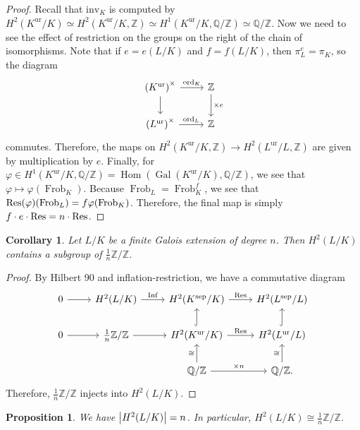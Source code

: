 \documentclass[leqno, openany]{memoir}
\newtheorem{cor}[thm]{Corollary}
\newtheorem{prop}[thm]{Proposition}
\theoremstyle{definition}
\theoremstyle{remark}
\theoremstyle{plain}
\theoremstyle{definition}
\theoremstyle{remark}
\newcommand{\Z}{\mathbb{Z}}
\newcommand{\Q}{\mathbb{Q}}
\newcommand{\mr}[1]{\mathrm{#1}}
\DeclareMathOperator{\Hom}{Hom}
\DeclareMathOperator{\Gal}{Gal}
\DeclareMathOperator{\Inf}{Inf}
\DeclareMathOperator{\Frob}{Frob}
\begin{document}
\begin{proof} Recall that $\mr{inv}_K$ is computed by $H^2(K^{\mr{ur}}/K)
    \simeq H^2(K^{\mr{ur}}/K, \Z) \simeq H^1(K^{\mr{ur}}/K, \Q/\Z) \simeq
    \Q/\Z$. Now we need to see the effect of restriction on the groups on the
    right of the chain of isomorphisms. Note that if $e = e(L/K)$ and $f =
    f(L/K)$, then $\pi_L^e = \pi_K$, so the diagram \begin{equation*}
        \begin{tikzcd} {(K^{\mr{ur}})}^{\times} \ar{d} \ar{r}{\mr{ord}_K} & \Z
        \ar{d}{\times e} \\ {(L^{\mr{ur}})}^{\times} \ar{r}{\mr{ord}_L} & \Z
    \end{tikzcd} \end{equation*} commutes. Therefore, the maps on
    $H^2(K^{\mr{ur}}/K, \Z) \to H^2(L^{\mr{ur}}/L, \Z)$ are given by
    multiplication by $e$. Finally, for $\varphi \in H^1(K^{\mr{ur}}/K, \Q/\Z)
    = \Hom(\Gal(K^{\mr{ur}}/K), \Q/\Z)$, we see that $\varphi \mapsto
    \varphi(\Frob_K)$. Because $\Frob_L = \Frob_K^f$, we see that
    $\Res(\varphi)(\Frob_L) = f \varphi(\Frob_K)$. Therefore, the final map is
    simply $f \cdot e \cdot \Res = n \cdot \Res$.  \end{proof}

\begin{cor} Let $L/K$ be a finite Galois extension of degree $n$. Then
$H^2(L/K)$ contains a subgroup of $\frac{1}{n} \Z/\Z$.  \end{cor}

\begin{proof} By Hilbert 90 and inflation-restriction, we have a commutative
    diagram \begin{equation*} \begin{tikzcd} 0 \ar{r} & H^2(L/K) \ar{r}{\Inf} &
        H^2(K^{\mr{sep}}/K) \ar{r}{\Res} & H^2(L^{\mr{sep}}/L) \\ 0 \ar{r} &
        \frac{1}{n}\Z/\Z \ar{r} & H^2(K^{\mr{ur}}/K) \ar{r}{\Res}
        \ar[hookrightarrow]{u} & H^2(L^{\mr{ur}}/L) \ar[hookrightarrow]{u} \\ &
                               & \Q/\Z \ar{r}{\times n} \ar{u}{\cong} & \Q/\Z
                           \ar{u}{\cong}.  \end{tikzcd} \end{equation*}
                       Therefore, $\frac{1}{n}\Z/\Z$ injects into $H^2(L/K)$.
    \end{proof}

\begin{prop} We have $\abs{H^2(L/K)} = n$. In particular, $H^2(L/K) \cong
\frac{1}{n} \Z/\Z$.  \end{prop}
\end{document}
